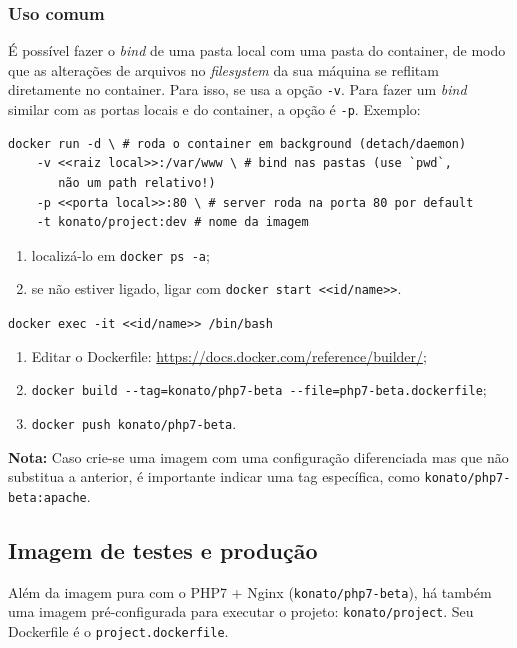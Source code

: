 \documentclass[12pt,a4paper,twoside,hyphens,english,brazil]{abntex2}
\begin{document}
{\subsubsection{Uso comum}

É possível fazer o \emph{bind} de uma pasta local com uma pasta do container, de modo que as alterações de arquivos no \emph{filesystem} da sua máquina se reflitam diretamente no container. Para isso, se usa a opção \texttt{-v}. Para fazer um \emph{bind} similar com as portas locais e do container, a opção é \texttt{-p}. Exemplo:
\begin{verbatim}
docker run -d \ # roda o container em background (detach/daemon)
    -v <<raiz local>>:/var/www \ # bind nas pastas (use `pwd`,
       não um path relativo!)
    -p <<porta local>>:80 \ # server roda na porta 80 por default
    -t konato/project:dev # nome da imagem
\end{verbatim}
    
\begin{enumerate}[itemsep=-1ex]
	\item localizá-lo em \texttt{docker ps -a};
	\item se não estiver ligado, ligar com \texttt{docker start <<id/name>>}.
\end{enumerate}

\texttt{docker exec -it <<id/name>> /bin/bash}

\begin{enumerate}[itemsep=-1ex]
	\item Editar o Dockerfile: \url{https://docs.docker.com/reference/builder/};
	\item \texttt{docker build -{}-tag=konato/php7-beta -{}-file=php7-beta.dockerfile};
	\item \texttt{docker push konato/php7-beta}.
\end{enumerate}
\textbf{Nota:} Caso crie-se uma imagem com uma configuração diferenciada mas que não substitua a anterior, é importante indicar uma tag específica, como \texttt{konato/php7-beta:apache}.

\subsection{Imagem de testes e produção}
Além da imagem pura com o PHP7 + Nginx (\texttt{konato/php7-beta}), há também uma imagem pré-configurada para executar o projeto: \texttt{konato/project}. Seu Dockerfile é o \texttt{project.dockerfile}.

}
\end{document}
